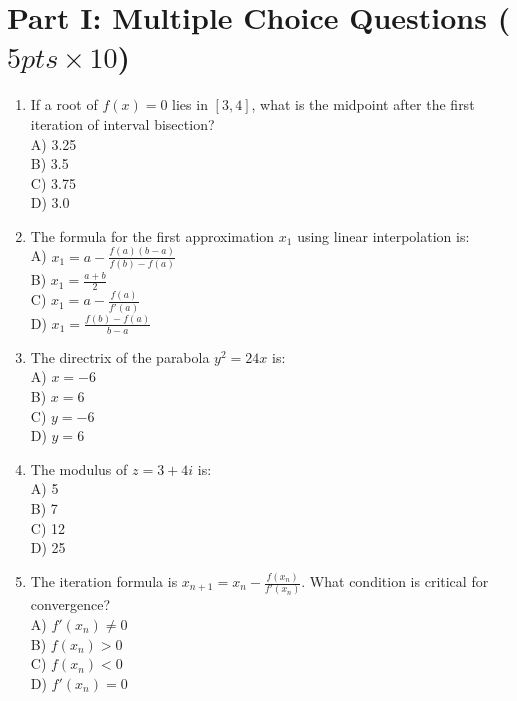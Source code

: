 \documentclass{sbs-exam}
\begin{document}
\maketitle

\examnotice

\makemarksheet

\examtools

\newpage


\section*{Part I: Multiple Choice Questions ($5pts\times 10$)}
\begin{enumerate}
\item 
If a root of $ f(x) = 0 $ lies in $[3, 4]$, what is the midpoint after the first iteration of interval bisection?\\
A) 3.25\\
B) 3.5\\
C) 3.75\\
D) 3.0

\item 
The formula for the first approximation $ x_1 $ using linear interpolation is:\\
A) $ x_1 = a - \frac{f(a)(b-a)}{f(b)-f(a)} $\\
B) $ x_1 = \frac{a + b}{2} $\\
C) $ x_1 = a - \frac{f(a)}{f'(a)} $\\
D) $ x_1 = \frac{f(b) - f(a)}{b - a} $

\item 
The directrix of the parabola $ y^2 = 24x $ is:\\
A) $ x = -6 $\\
B) $ x = 6 $\\
C) $ y = -6 $\\
D) $ y = 6 $

\item  
The modulus of $ z = 3 + 4i $ is:\\
A) 5\\
B) 7\\
C) 12\\
D) 25

\item 
The iteration formula is $ x_{n+1} = x_n - \frac{f(x_n)}{f'(x_n)} $. What condition is critical for convergence?\\
A) $ f'(x_n) \neq 0 $\\
B) $ f(x_n) > 0 $\\
C) $ f(x_n) < 0 $\\
D) $ f'(x_n) = 0 $


\end{enumerate}
\end{document}
